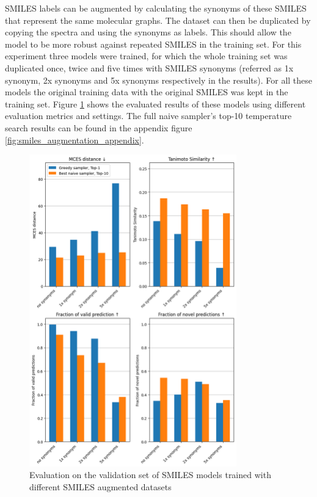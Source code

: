 SMILES labels can be augmented by calculating the synonyms of these SMILES that represent the same molecular graphs.
The dataset can then be duplicated by copying the spectra and using the synonyms as labels.
This should allow the model to be more robust against repeated SMILES in the training set.
For this experiment three models were trained, for which the whole training set was duplicated once, twice and five times with SMILES synonyms (referred as 1x synonym, 2x synonyms and 5x synonyms respectively in the results).
For all these models the original training data with the original SMILES was kept in the training set.
Figure \ref{fig:smiles_augm} shows the evaluated results of these models using different evaluation metrics and settings.
The full naive sampler's top-10 temperature search results can be found in the appendix figure \ref{fig:smiles_augmentation_appendix}.

\begin{figure}[h]
    \centering
    \includegraphics[width=0.8\textwidth]{figures/results/smiles_augmentation_with_tanimoto.png}
    \caption{Evaluation on the validation set of SMILES models trained with different SMILES augmented datasets}
    \label{fig:smiles_augm}
\end{figure}

